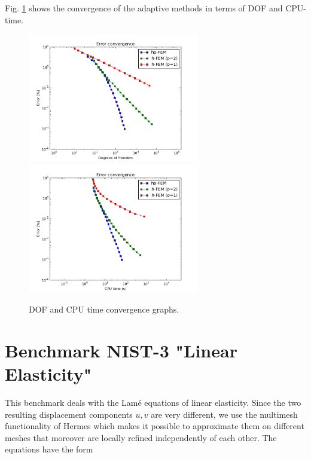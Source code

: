 \documentclass[12pt]{elsarticle}
\begin{document}
Fig. \ref{fig:nist-2-conv} shows the convergence of the adaptive methods in terms of DOF and CPU-time.


\begin{figure}[H]
\centering
\hspace{-50mm}
\includegraphics[width=7.5cm]{nist/nist-2/conv_dof_aniso.png}\ \
\hspace{-10mm}
\includegraphics[width=7.5cm]{nist/nist-2/conv_cpu_aniso.png}
\hspace{-50mm}
\caption{DOF and CPU time convergence graphs.}
\label{fig:nist-2-conv}
\end{figure}


\section{Benchmark NIST-3 "Linear Elasticity"}
\label{sec:bench-3}

This benchmark deals with the Lam\'e equations of linear elasticity.
Since the two resulting displacement components $u, v$ are very different, we use the
multimesh functionality of Hermes \cite{label2,thermoel} which makes it
possible to approximate them on different meshes that moreover
are locally refined independently of each other.
The equations have the form
\end{document}
